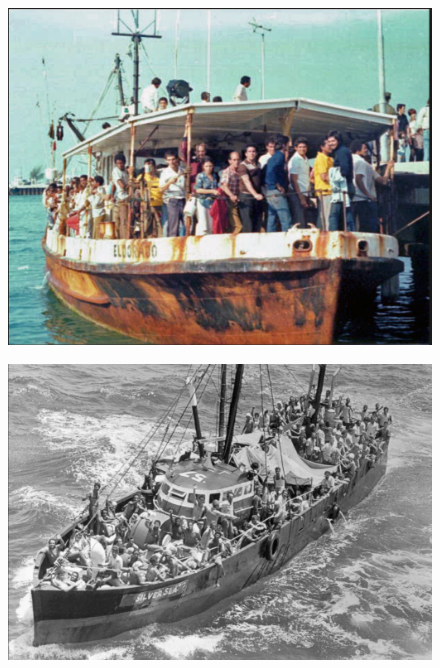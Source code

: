 \documentclass[notes=show]{beamer}
\begin{document}
\begin{frame}[plain]
	\begin{figure}
	\includegraphics[scale=0.25]{./lecture_includes/boatlift3}
	\end{figure}
\end{frame}

\begin{frame}[plain]
	\begin{figure}
	\includegraphics[scale=0.25]{./lecture_includes/boatlift4}
	\end{figure}
\end{frame}
\end{document}
